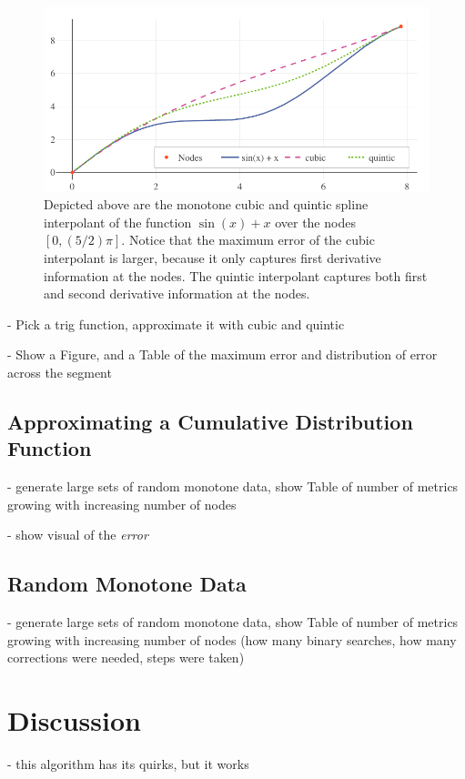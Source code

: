 \documentclass{scspaperproc}
\theoremstyle{scsthe}
\begin{document}
\begin{figure}[htb]
  \centering
  \includegraphics[width=.7\textwidth]{cubic-quintic-sin}
  \caption{Depicted above are the monotone cubic and quintic spline
    interpolant of the function $\sin(x) + x$ over the nodes $[0,
      (5/2) \pi]$.  Notice that the maximum error of the cubic
    interpolant is larger, because it only captures first derivative
    information at the nodes. The quintic interpolant captures both
    first and second derivative information at the nodes.
  }\label{fig:cubic-quintic-sin}
\end{figure}


- Pick a trig function, approximate it with cubic and quintic

- Show a Figure, and a Table of the maximum error and distribution of
  error across the segment

\subsection{Approximating a Cumulative Distribution Function}

- generate large sets of random monotone data, show Table of number
  of metrics growing with increasing number of nodes

- show visual of the \textit{error} 

\subsection{Random Monotone Data}

- generate large sets of random monotone data, show Table of number
  of metrics growing with increasing number of nodes (how many binary
  searches, how many corrections were needed, steps were taken)

\section{Discussion}

- this algorithm has its quirks, but it works
\end{document}
